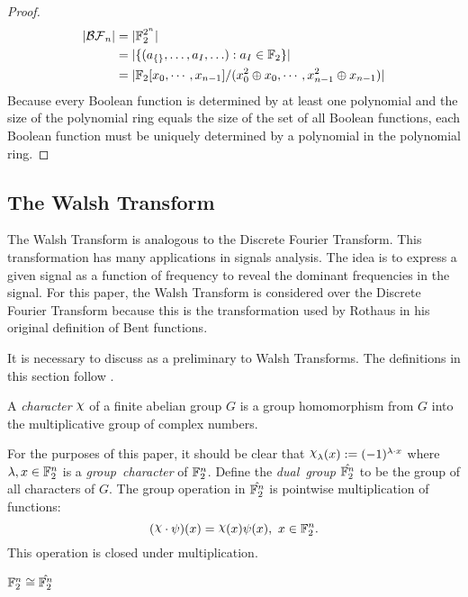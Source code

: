 \begin{proof}
  \begin{align*}
  \lvert\mathcal{BF}_n\rvert
    &= \lvert \mathbb{F}_2^{2^n} \rvert \\
    &= \lvert \{(a_{\{\}},\ldots,a_I,\ldots):a_I\in\mathbb{F}_2\} \rvert \\
    &= \lvert \mathbb{F}_2[x_0,\cdots,x_{n-1}]/ (x_0^2\oplus x_0,\cdots,
    x_{n-1}^2 \oplus x_{n-1})\rvert
  \end{align*}
  Because every Boolean function is determined by at least one polynomial
  and the size of the polynomial ring equals the size of the set of all
  Boolean functions, each Boolean function must be uniquely determined by a
  polynomial in the polynomial ring.
\end{proof}

\subsection{The Walsh Transform}
\par The Walsh Transform is analogous to the Discrete Fourier Transform.
This transformation has many applications in signals
analysis. The idea is to express a given signal as a function of frequency
to reveal the dominant frequencies in the signal. For this paper, the Walsh
Transform is considered over the Discrete Fourier Transform because this is
the transformation used by Rothaus in his original definition of Bent
functions.

\par It is necessary to discuss  as a preliminary to Walsh
Transforms. The definitions in this section follow \cite{bk:t99}.

\begin{definition}
  A {\em character} $\Chi$ of a finite abelian group $G$ is a group
  homomorphism from $G$ into the multiplicative group of complex numbers.
\end{definition}

For the purposes of this paper, it should be clear that
$\Chi_\lambda(x):=(-1)^{\lambda\cdot x}$ where $\lambda,x\in\mathbb{F}_2^n$ is a
{\em group\ character} of $\mathbb{F}_2^n$. Define the {\em dual\ group}
$\hat{\mathbb{F}_2^n}$ to be the group of all characters of $G$. The group
operation
in $\hat{\mathbb{F}_2^n}$ is pointwise multiplication of functions:
\[
(\Chi\cdot\psi)(x)=\Chi(x)\psi(x),\ x\in\gftwo^n.
\]
This operation is closed under multiplication.

\begin{lemma}
  $\mathbb{F}_2^n\cong\hat{\mathbb{F}_2^n}$
\end{lemma}

